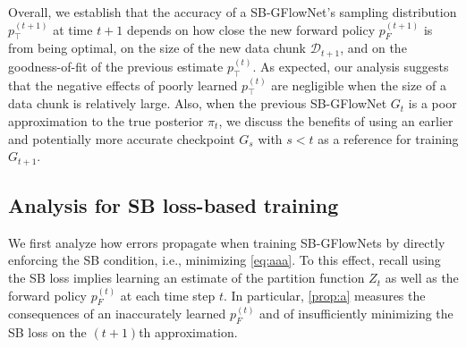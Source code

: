 \documentclass{article}
\theoremstyle{plain}
\theoremstyle{definition}
\theoremstyle{remark}
\theoremstyle{remark}
\begin{document}
Overall, we establish that the accuracy of a SB-GFlowNet's sampling distribution $p_{\top}^{(t + 1)}$ at time $t+1$ depends on how close the new forward policy $p_{F}^{(t + 1)}$ is from being optimal, on the size of the new data chunk $\mathcal{D}_{t + 1}$, and on the goodness-of-fit of the previous estimate $p_{\top}^{(t)}$. As expected, our analysis suggests that the negative effects of poorly learned $p_{\top}^{(t)}$ are negligible when the size of a data chunk is relatively large. Also, when the previous SB-GFlowNet $G_{t}$ is a poor approximation to the true posterior $\pi_{t}$, we discuss the benefits of using an earlier and potentially more accurate checkpoint $G_{s}$ with $s < t$ as a reference for training $G_{t+1}$.



\subsection{Analysis for SB loss-based training} 

We first analyze how errors propagate when training SB-GFlowNets by directly enforcing the SB condition, i.e., minimizing \autoref{eq:aaa}. To this effect, recall using the SB loss implies learning an estimate of the partition function $Z_t$ as well as the forward policy $p_F^{(t)}$ at each time step $t$. In particular, \autoref{prop:a} measures the consequences of an inaccurately learned $p_{F}^{(t)}$ and of insufficiently minimizing the SB loss on the $(t + 1)$th approximation.  

\end{document}

